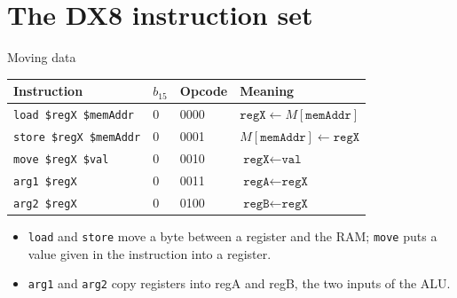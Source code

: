 \documentclass[10pt]{wosm-slides}
\begin{document}
\section{The DX8 instruction set}

\begin{frame}{Moving data}
  \begin{center}
    \begin{tabular}{@{}llll@{}}
      \toprule
      Instruction & $b_{15}$ & Opcode & Meaning \\
      \midrule
      \texttt{load \$regX \$memAddr}  & 0 & 0000 & $\texttt{regX} \leftarrow M[\texttt{memAddr}]$ \\
      \texttt{store \$regX \$memAddr} & 0 & 0001 & $M[\texttt{memAddr}] \leftarrow \texttt{regX}$ \\
      \texttt{move \$regX \$val}      & 0 & 0010 & $\texttt{regX} \leftarrow \texttt{val}$ \\
      \texttt{arg1 \$regX}            & 0 & 0011 & $\texttt{regA} \leftarrow \texttt{regX}$ \\
      \texttt{arg2 \$regX}            & 0 & 0100 & $\texttt{regB} \leftarrow \texttt{regX}$ \\
      \bottomrule
    \end{tabular}\par\smallskip
  \end{center}

  \begin{itemize}
    \item \texttt{load} and \texttt{store} move a byte between a register and the RAM;
      \texttt{move} puts a value given in the instruction into a register.
    \item \texttt{arg1} and \texttt{arg2} copy registers into regA and regB, the two
      inputs of the ALU.
  \end{itemize}
\end{frame}
\end{document}
